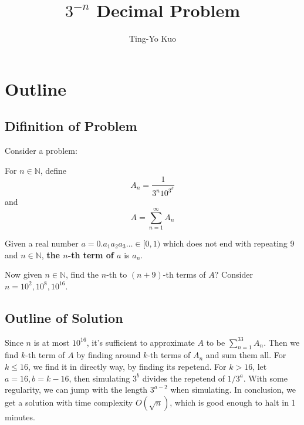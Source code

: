 \documentclass[paper=a4]{scrartcl}
\title{$3^{-n}$ Decimal Problem}
\author{Ting-Yo Kuo}
\date{}
\begin{document}
\maketitle
\setcounter{section}{0}
\section{Outline}
\subsection{Difinition of Problem}
Consider a problem:

\begin{tcolorbox}[arc=0pt,colback=white,title={Definition}]
For $n\in\mathbb{N}$, define 
\[
A_n=\frac{1}{3^n10^{3^k}}
\]
and
\[
A=\sum_{n=1}^\infty A_n
\]
\end{tcolorbox}
\begin{tcolorbox}[arc=0pt,colback=white,title={Definition}]
Given a real number $a=0.a_1a_2a_3\ldots\in[0,1)$ which does not end with repeating 9 and $n\in\mathbb{N}$, \textbf{the $n$-th term of $a$} is $a_n$.  
\end{tcolorbox}
Now given $n\in\mathbb{N}$,  find the $n$-th to $(n+9)$-th terms of $A$? Consider $n=10^2,10^8,10^{16}$.

\subsection{Outline of Solution}
Since $n$ is at most $10^{16}$, it's sufficient to approximate $A$ to be $\sum_{n=1}^{33}A_n$. Then we find $k$-th term of $A$ by finding around $k$-th terms of $A_n$ and sum them all. For $k\leq 16$, we find it in directly way, by finding its repetend. For $k>16$, let $a = 16, b = k-16$, then simulating $3^b$ divides the repetend of $1/3^a$. With some regularity, we can jump with the length $3^{a-2}$ when simulating. In conclusion, we get a solution with time complexity $O(\sqrt{n})$, which is good enough to halt in 1 minutes.
\end{document}
